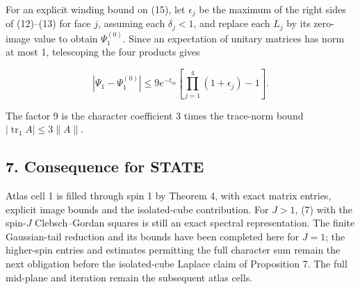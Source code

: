 \documentclass[11pt,a4paper]{article}
\begin{document}
For an explicit winding bound on (15), let \(\epsilon_j\) be the maximum
of the right sides of (12)--(13) for face \(j\), assuming each
\(\delta_j<1\), and replace each \(L_j\) by its zero-image value to
obtain \(\Psi_1^{(0)}\). Since an expectation of unitary matrices has
norm at most 1, telescoping the four products gives

\[|\Psi_1-\Psi_1^{(0)}|
\le9e^{-t_m}\left[\prod_{j=1}^4(1+\epsilon_j)-1\right]. \tag{16}\]

The factor 9 is the character coefficient 3 times the trace-norm bound
\(|\operatorname{tr}_1 A|\le3\|A\|\).

\hypertarget{consequence-for-state}{%
\subsection{7. Consequence for STATE}\label{consequence-for-state}}

Atlas cell 1 is filled through spin 1 by Theorem 4, with exact matrix
entries, explicit image bounds and the isolated-cube contribution. For
\(J>1\), (7) with the spin-\(J\) Clebsch--Gordan squares is still an
exact spectral representation. The finite Gaussian-tail reduction and
its bounds have been completed here for \(J=1\); the higher-spin entries
and estimates permitting the full character sum remain the next
obligation before the isolated-cube Laplace claim of Proposition 7. The
full mid-plane and iteration remain the subsequent atlas cells.
\end{document}

